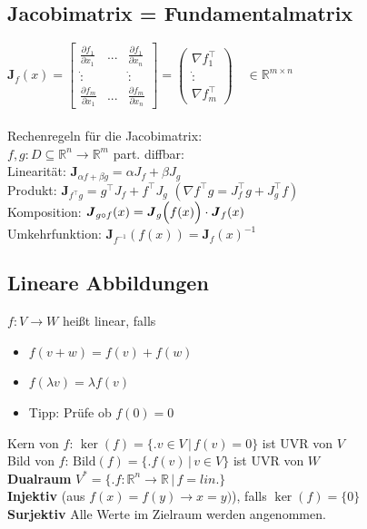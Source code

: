 \documentclass[6pt,a4paper]{scrartcl}
\let\olddot = \dot
\newcommand{\iset}[2]{\ensuremath{\bigl\{ \bigl. #1 \, \bigr| \, #2 \bigr\}}}					%
\newcommand{\eset}[1]{\ensuremath{\bigl\{#1\bigr\}}}											%
\newcommand{\ma}[1]{\ensuremath{\boldsymbol {#1}}}												%
\newcommand{\svdots}{\ensuremath{\olddot :}}													%
\renewcommand{\emph}[1]{\textbf{#1}}															%
\renewcommand*{\dot}[1]{\accentset{\mbox{\textrm{\large\bfseries .}} }{#1}}						%
\newcommand{\ra}[0]{\ensuremath{\rightarrow}} 									%
\begin{document}
\begin{multicols*}{4}
\subsection{Jacobimatrix = Fundamentalmatrix}
$\ma J_f (x) = \begin{bmatrix} \frac{\partial f_1}{\partial x_1} & ... & \frac{\partial f_1}{\partial x_n} \\ \svdots & & \svdots \\ \frac{\partial f_m}{\partial x_1} & ... & \frac{\partial f_m}{\partial x_n} \end{bmatrix} = \begin{pmatrix} \nabla f_1^\top \\ \svdots \\ \nabla f_m^\top \end{pmatrix}  \quad \in \mathbb R^{m \times n}$\\ \\
Rechenregeln für die Jacobimatrix:\\
$f,g: D \subseteq \mathbb R^n \rightarrow \mathbb R^m$ part. diffbar:\\
Linearität: $\ma J_{\alpha f + \beta g} = \alpha J_f + \beta J_g$\\
Produkt: $\ma J_{f^\top g} = g^\top J_f + f^\top J_g$ \quad $(\nabla f^\top g = J_f^\top g + J_g^\top f)$\\
Komposition: $\ma J_{g \circ f}(x) = \ma J_g\Bigl(f(x)\Bigr) \cdot \ma J_f(x)$\\
Umkehrfunktion: $\ma J_{f^{-1}} (f(x)) = \ma J_f (x)^{-1}$

\subsection{Lineare Abbildungen}
$f:V \rightarrow W$ heißt linear, falls

\begin{itemize}\itemsep0pt
	\item $f(v+w) = f(v) + f(w)$
	\item $f(\lambda v) = \lambda f(v)$
	\item Tipp: Prüfe ob $f(0) = 0$
\end{itemize}
Kern von $f$: $\ker (f) = \iset{v \in V}{f(v) = 0}$ ist UVR von $V$\\
Bild von $f$: $\mathrm{Bild}(f) = \iset{f(v)}{v \in V}$ ist UVR von $W$\\
\emph{Dualraum} $V^* = \iset{f:\mathbb R^n \rightarrow \mathbb R}{f=lin.}$\\
\emph{Injektiv} (aus $f(x) = f(y) \ra x = y)$), falls $\ker(f) = \eset{0}$ \\
\emph{Surjektiv} Alle Werte im Zielraum werden angenommen.
\fi


\end{multicols*}
\end{document}
